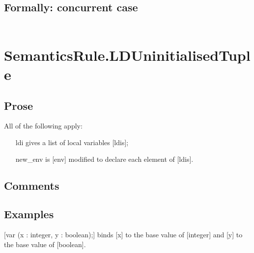\documentclass{book}
\begin{document}
  \subsection{Formally: concurrent case}
  \begin{align}
  \end{align} 

\section{SemanticsRule.LDUninitialisedTuple \label{sec:SemanticsRule.LDUninitialisedTuple}}

    \subsection{Prose}
    All of the following apply:
    \begin{itemize}
    \item [ldi] gives a list of local variables [ldis];
    \item [new\_env] is [env] modified to declare each element of [ldis].
    \end{itemize}

    \subsection{Comments}

    \subsection{Examples}
    [var (x : integer, y : boolean);] binds [x] to the base value of [integer]
    and [y] to the base value of [boolean].
\end{document}
